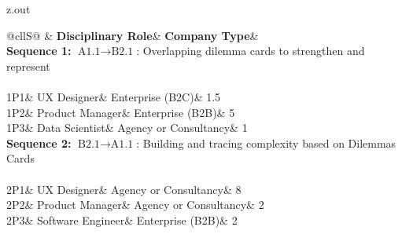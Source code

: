 \begin{VerbatimOut}{z.out}
\begin{table}[ht]
  \caption{Participant descriptors for twelve practitioners engaged in co-creation activities}
  \label{tab:22participants}
  \center
  \begin{tabular}{@{}cllS@{}}
    \toprule
    &
      \textbf{Disciplinary Role}&
      \textbf{Company Type}&
      \\
    \midrule
    {%
      \textbf{Sequence 1:} $\text{A1.1}\to\text{B2.1}$:
      Overlapping dilemma cards to strengthen and represent%
    }\\
    \\
    1P1& UX Designer& Enterprise (B2C)& 1.5\\
    1P2& Product Manager& Enterprise (B2B)& 5\\
    1P3& Data Scientist& Agency or Consultancy& 1\\
    \noalign{\vspace{8pt}}
    {%
      \textbf{Sequence 2:} $\text{B2.1}\to\text{A1.1}$:
      Building and tracing complexity based on Dilemmas Cards%
    }\\
    \\
    2P1& UX Designer& Agency or Consultancy& 8\\
    2P2& Product Manager& Agency or Consultancy& 2\\
    2P3& Software Engineer& Enterprise (B2B)& 2\\
    \bottomrule
  \end{tabular}
\end{table}
\end{VerbatimOut}

\MyIO


